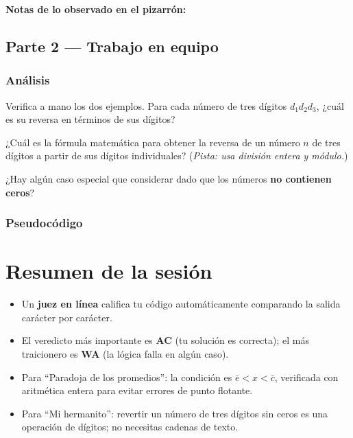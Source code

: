 \documentclass[12pt, oneside]{article}
\begin{document}
\textbf{Notas de lo observado en el pizarrón:}

\vspace{3cm}

\subsection{Parte 2 — Trabajo en equipo}

\subsubsection{Análisis}

Verifica a mano los dos ejemplos.  Para cada número de tres dígitos $d_1 d_2 d_3$,
¿cuál es su reversa en términos de sus dígitos?

\vspace{2cm}

¿Cuál es la fórmula matemática para obtener la reversa de un número $n$ de
tres dígitos a partir de sus dígitos individuales?
(\textit{Pista: usa división entera y módulo.})

\vspace{3cm}

¿Hay algún caso especial que considerar dado que los números \textbf{no
contienen ceros}?

\vspace{2cm}

\subsubsection{Pseudocódigo}

\vspace{5cm}

\newpage

\section{Resumen de la sesión}

\begin{itemize}
  \item Un \textbf{juez en línea} califica tu código automáticamente comparando
        la salida carácter por carácter.
  \item El veredicto más importante es \textbf{AC} (tu solución es correcta);
        el más traicionero es \textbf{WA} (la lógica falla en algún caso).
  \item Para ``Paradoja de los promedios'': la condición es
        $\bar{e} < x < \bar{c}$, verificada con aritmética entera para
        evitar errores de punto flotante.
  \item Para ``Mi hermanito'': revertir un número de tres dígitos sin ceros
        es una operación de dígitos; no necesitas cadenas de texto.
\end{itemize}
\end{document}
